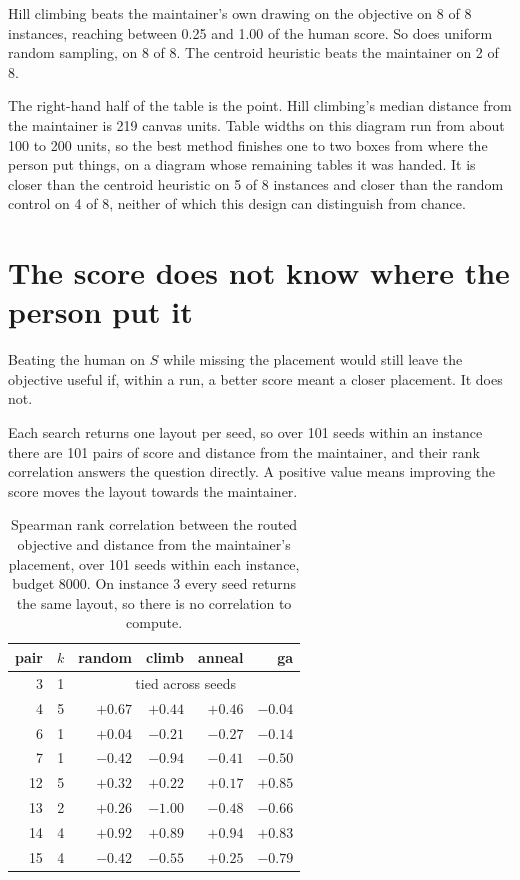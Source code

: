 \documentclass[11pt]{article}
\begin{document}
Hill climbing beats the maintainer's own drawing on the objective on 8 of 8 instances, reaching
between 0.25 and 1.00 of the human score. So does uniform random sampling, on 8 of 8. The
centroid heuristic beats the maintainer on 2 of 8.

The right-hand half of the table is the point. Hill climbing's median distance from the
maintainer is 219 canvas units. Table widths on this diagram run from about 100 to 200 units, so
the best method finishes one to two boxes from where the person put things, on a diagram whose
remaining tables it was handed. It is closer than the centroid heuristic on 5 of 8 instances and
closer than the random control on 4 of 8, neither of which this design can distinguish from
chance.

\section{The score does not know where the person put it}\label{sec:rho}

Beating the human on $S$ while missing the placement would still leave the objective useful if,
within a run, a better score meant a closer placement. It does not.

Each search returns one layout per seed, so over 101 seeds within an instance there are 101
pairs of score and distance from the maintainer, and their rank correlation answers the question
directly. A positive value means improving the score moves the layout towards the maintainer.

\begin{table}[h]
\centering
\caption{Spearman rank correlation between the routed objective and distance from the
maintainer's placement, over 101 seeds within each instance, budget 8000. On instance 3 every
seed returns the same layout, so there is no correlation to compute.}
\label{tab:rho}
\begin{tabular}{rr|rrrr}
\toprule
pair & $k$ & random & climb & anneal & ga \\
\midrule
 3 & 1 & \multicolumn{4}{c}{tied across seeds} \\
 4 & 5 & $+0.67$ & $+0.44$ & $+0.46$ & $-0.04$ \\
 6 & 1 & $+0.04$ & $-0.21$ & $-0.27$ & $-0.14$ \\
 7 & 1 & $-0.42$ & $-0.94$ & $-0.41$ & $-0.50$ \\
12 & 5 & $+0.32$ & $+0.22$ & $+0.17$ & $+0.85$ \\
13 & 2 & $+0.26$ & $-1.00$ & $-0.48$ & $-0.66$ \\
14 & 4 & $+0.92$ & $+0.89$ & $+0.94$ & $+0.83$ \\
15 & 4 & $-0.42$ & $-0.55$ & $+0.25$ & $-0.79$ \\
\bottomrule
\end{tabular}
\end{table}
\end{document}
